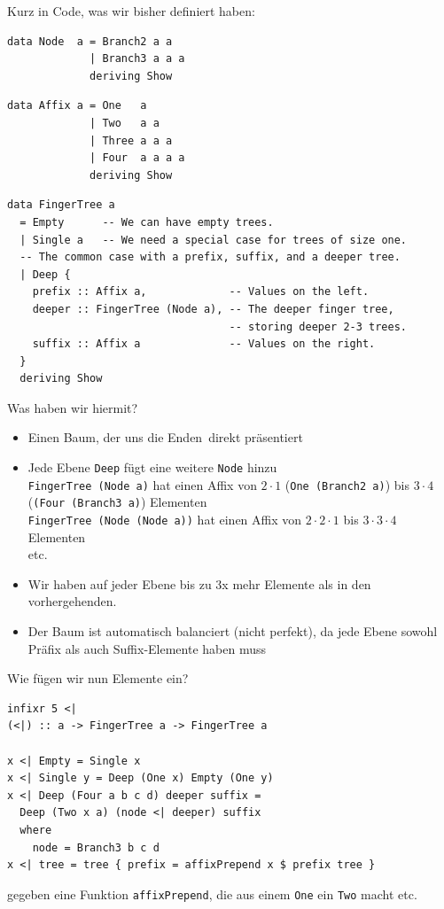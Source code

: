 \documentclass{beamer}
\begin{document}
\begin{frame}[fragile]
Kurz in Code, was wir bisher definiert haben:
\begin{verbatim}
data Node  a = Branch2 a a
             | Branch3 a a a
             deriving Show
\end{verbatim}
\pause
\begin{verbatim}
data Affix a = One   a
             | Two   a a
             | Three a a a
             | Four  a a a a
             deriving Show
\end{verbatim}
\pause
\begin{verbatim}
data FingerTree a 
  = Empty      -- We can have empty trees.
  | Single a   -- We need a special case for trees of size one.
  -- The common case with a prefix, suffix, and a deeper tree.
  | Deep {
    prefix :: Affix a,             -- Values on the left.
    deeper :: FingerTree (Node a), -- The deeper finger tree,
                                   -- storing deeper 2-3 trees.
    suffix :: Affix a              -- Values on the right.
  }
  deriving Show
\end{verbatim}
\end{frame}

\begin{frame}
Was haben wir hiermit?\\\par\pause\bigskip
\begin{itemize}
 \item Einen Baum, der uns die \glqq Enden\grqq \ direkt präsentiert
 \pause
 \item Jede Ebene \texttt{Deep} fügt eine weitere \texttt{Node} hinzu\\\pause
       \texttt{FingerTree (Node a)} hat einen Affix von $2\cdot 1$ (\texttt{One (Branch2 a)}) bis $3\cdot 4$ (\texttt{(Four (Branch3 a)}) Elementen\\\pause
       \texttt{FingerTree (Node (Node a))} hat einen Affix von $2 \cdot 2\cdot 1$ bis $3 \cdot 3\cdot 4$ Elementen\\\pause
       etc.
 \pause
 \item Wir haben auf jeder Ebene bis zu 3x mehr Elemente als in den vorhergehenden.
 \pause
 \item Der Baum ist automatisch balanciert (nicht perfekt), da jede Ebene sowohl Präfix als auch Suffix-Elemente haben muss
\end{itemize}
\end{frame}

\begin{frame}[fragile]
Wie fügen wir nun Elemente ein?\pause
\begin{verbatim}
infixr 5 <|
(<|) :: a -> FingerTree a -> FingerTree a

x <| Empty = Single x
x <| Single y = Deep (One x) Empty (One y)
x <| Deep (Four a b c d) deeper suffix =
  Deep (Two x a) (node <| deeper) suffix
  where
    node = Branch3 b c d
x <| tree = tree { prefix = affixPrepend x $ prefix tree }
\end{verbatim}
gegeben eine Funktion \texttt{affixPrepend}, die aus einem \texttt{One} ein \texttt{Two} macht etc.
\end{frame}
\end{document}
